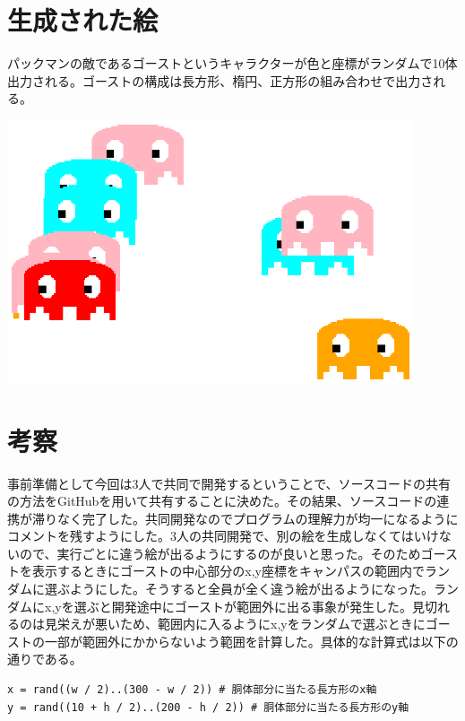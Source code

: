 \documentclass[12pt,a4j]{jarticle}
\begin{document}
\section{生成された絵}

パックマンの敵であるゴーストというキャラクターが色と座標がランダムで10体出力される。ゴーストの構成は長方形、楕円、正方形の組み合わせで出力される。

\begin{center}
\includegraphics[width=12cm]{packman.ps}
\end{center}

\section{考察}

事前準備として今回は3人で共同で開発するということで、ソースコードの共有の方法をGitHubを用いて共有することに決めた。その結果、ソースコードの連携が滞りなく完了した。共同開発なのでプログラムの理解力が均一になるようにコメントを残すようにした。3人の共同開発で、別の絵を生成しなくてはいけないので、実行ごとに違う絵が出るようにするのが良いと思った。そのためゴーストを表示するときにゴーストの中心部分のx,y座標をキャンパスの範囲内でランダムに選ぶようにした。そうすると全員が全く違う絵が出るようになった。ランダムにx,yを選ぶと開発途中にゴーストが範囲外に出る事象が発生した。見切れるのは見栄えが悪いため、範囲内に入るようにx,yをランダムで選ぶときにゴーストの一部が範囲外にかからないよう範囲を計算した。具体的な計算式は以下の通りである。

\begin{verbatim}
x = rand((w / 2)..(300 - w / 2)) # 胴体部分に当たる長方形のx軸
y = rand((10 + h / 2)..(200 - h / 2)) # 胴体部分に当たる長方形のy軸
\end{verbatim}
\end{document}
